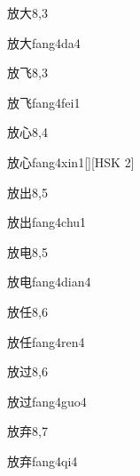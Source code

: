 \begin{entry}{放大}{8,3}
  \begin{phonetics}{放大}{fang4da4}
  \end{phonetics}
\end{entry}

\begin{entry}{放飞}{8,3}
  \begin{phonetics}{放飞}{fang4fei1}
  \end{phonetics}
\end{entry}

\begin{entry}{放心}{8,4}
  \begin{phonetics}{放心}{fang4xin1}[][HSK 2]
  \end{phonetics}
\end{entry}

\begin{entry}{放出}{8,5}
  \begin{phonetics}{放出}{fang4chu1}
  \end{phonetics}
\end{entry}

\begin{entry}{放电}{8,5}
  \begin{phonetics}{放电}{fang4dian4}
  \end{phonetics}
\end{entry}

\begin{entry}{放任}{8,6}
  \begin{phonetics}{放任}{fang4ren4}
  \end{phonetics}
\end{entry}

\begin{entry}{放过}{8,6}
  \begin{phonetics}{放过}{fang4guo4}
  \end{phonetics}
\end{entry}

\begin{entry}{放弃}{8,7}
  \begin{phonetics}{放弃}{fang4qi4}
  \end{phonetics}
\end{entry}

